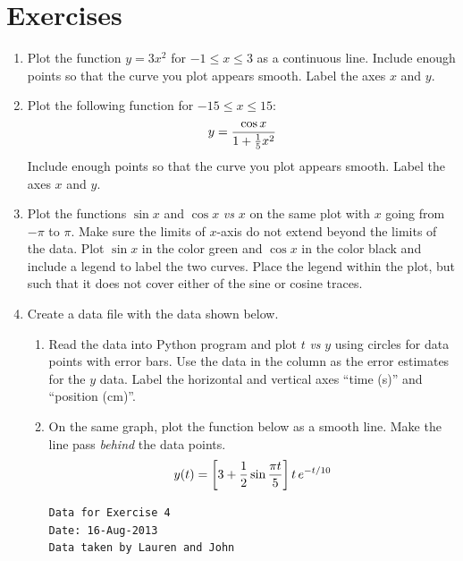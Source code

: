 \documentclass[letterpaper,10pt,english]{sphinxmanual}
\begin{document}
\section{Exercises}
\label{chap5/chap5_plot:exercises}\begin{enumerate}
\item {} 
Plot the function $y=3x^2$ for $-1 \le x \le 3$ as a continuous line.  Include enough points so that the curve you plot appears smooth.  Label the axes $x$ and $y$.

\item {} 
Plot the following function for $-15 \le x \le 15$:
\begin{gather}
\begin{split}y = \frac{\cos x}{1+\frac{1}{5}x^2}\end{split}\notag
\end{gather}
Include enough points so that the curve you plot appears smooth.  Label the axes $x$ and $y$.

\item {} 
Plot the functions $\sin x$ and $\cos x$ \emph{vs} $x$ on the same plot with $x$ going from $-\pi$ to $\pi$.  Make sure the limits of $x$-axis do not extend beyond the limits of the data.  Plot $\sin x$ in the color green and $\cos x$ in the color black and include a legend to label the two curves.  Place the legend within the plot, but such that it does not cover either of the sine or cosine traces.

\item {} 
Create a data file with the data shown below.
\begin{enumerate}
\item {} 
Read the data into Python program and plot $t$ \emph{vs} $y$ using circles for data points with error bars.  Use the data in the  column as the error estimates for the $y$ data.  Label the horizontal and vertical axes ``time (s)'' and ``position (cm)''.

\item {} 
On the same graph, plot the function below as a smooth line.  Make the line pass \emph{behind} the data points.
\begin{gather}
\begin{split}y(t) = \left[3 +
       \frac{1}{2}\sin\frac{\pi t}{5}\right]
       t\, e^{-t/10}\end{split}\notag
\end{gather}
\begin{Verbatim}[commandchars=\\\{\}]
Data for Exercise 4
Date: 16-Aug-2013
Data taken by Lauren and John


\end{Verbatim}
\end{enumerate}
\end{enumerate}
\end{document}
